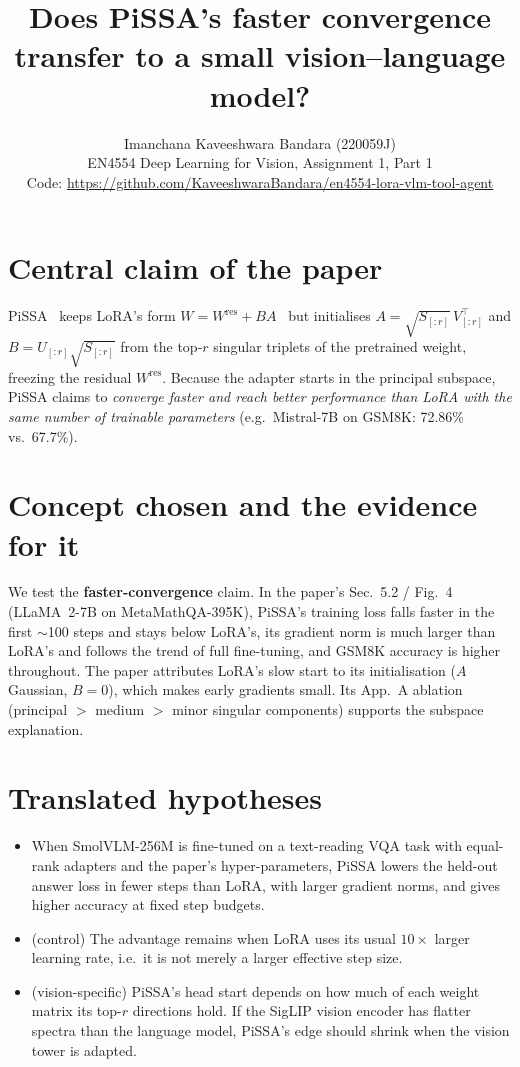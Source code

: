 \documentclass[10pt,a4paper]{article}
\title{\vspace{-1.4cm}\Large\textbf{Does PiSSA's faster convergence transfer to a small vision--language model?}}
\author{Imanchana Kaveeshwara Bandara (220059J) \\ \small EN4554 Deep Learning for Vision, Assignment 1, Part 1 \\
\small Code: \url{https://github.com/KaveeshwaraBandara/en4554-lora-vlm-tool-agent}}
\date{\vspace{-0.9cm}}
\begin{document}
\maketitle

\section{Central claim of the paper}
PiSSA~\cite{pissa} keeps LoRA's form $W = W^{\text{res}} + BA$~\cite{lora} but initialises $A=\sqrt{S_{[:r]}}\,V^\top_{[:r]}$ and $B=U_{[:r]}\sqrt{S_{[:r]}}$ from the top-$r$ singular triplets of the pretrained weight, freezing the residual $W^{\text{res}}$. Because the adapter starts in the principal subspace, PiSSA claims to \emph{converge faster and reach better performance than LoRA with the same number of trainable parameters} (e.g.\ Mistral-7B on GSM8K: 72.86\% vs.\ 67.7\%).

\section{Concept chosen and the evidence for it}
We test the \textbf{faster-convergence} claim. In the paper's Sec.~5.2 / Fig.~4 (LLaMA~2-7B on MetaMathQA-395K), PiSSA's training loss falls faster in the first $\sim$100 steps and stays below LoRA's, its gradient norm is much larger than LoRA's and follows the trend of full fine-tuning, and GSM8K accuracy is higher throughout. The paper attributes LoRA's slow start to its initialisation ($A$ Gaussian, $B=0$), which makes early gradients small. Its App.~A ablation (principal $>$ medium $>$ minor singular components) supports the subspace explanation.

\section{Translated hypotheses}
\begin{itemize}
\item[\textbf{H1}] When SmolVLM-256M is fine-tuned on a text-reading VQA task with equal-rank adapters and the paper's hyper-parameters, PiSSA lowers the held-out answer loss in fewer steps than LoRA, with larger gradient norms, and gives higher accuracy at fixed step budgets.
\item[\textbf{H1$'$}] (control) The advantage remains when LoRA uses its usual $10\times$ larger learning rate, i.e.\ it is not merely a larger effective step size.
\item[\textbf{H2}] (vision-specific) PiSSA's head start depends on how much of each weight matrix its top-$r$ directions hold. If the SigLIP vision encoder has flatter spectra than the language model, PiSSA's edge should shrink when the vision tower is adapted.
\end{itemize}
\end{document}
